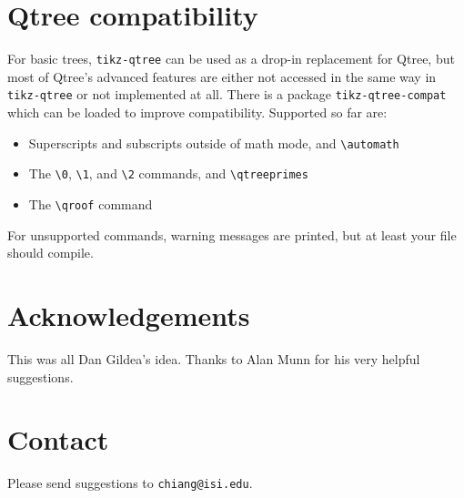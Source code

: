 \documentclass{article}
\newcommand\tikztree{\texttt{tikz-qtree}}
\begin{document}
\section{Qtree compatibility}

For basic trees, \tikztree{} can be used as a drop-in replacement for Qtree, but most of Qtree's advanced features are either not accessed in the same way in \tikztree{} or not implemented at all. There is a package \verb|tikz-qtree-compat| which can be loaded to improve compatibility. Supported so far are:
\begin{itemize}
\item Superscripts and subscripts outside of math mode, and \verb|\automath|
\item The \verb|\0|, \verb|\1|, and \verb|\2| commands, and \verb|\qtreeprimes|
\item The \verb|\qroof| command
\end{itemize}
For unsupported commands, warning messages are printed, but at least your file should compile.

\section*{Acknowledgements}
This was all Dan Gildea's idea. Thanks to Alan Munn for his very helpful suggestions.

\section*{Contact}
Please send suggestions to \verb|chiang@isi.edu|.
\end{document}
